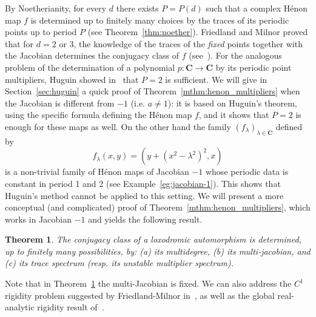 \documentclass[oneside, 12pt]{amsart}
\newcommand{\C}{\mathbf{C}}
\theoremstyle{plain}
\newtheorem{mthm}{Theorem}
\theoremstyle{definition}
\numberwithin{equation}{section}       %
\numberwithin{equation}{section}       %
\begin{document}
By Noetherianity,
for every $d$ there exists $P=P(d)$ 
such that a complex Hénon map $f$ is determined
up to finitely many choices by the  traces of its  periodic points up to period 
$P$ (see  Theorem~\ref{thm:noether}). Friedland and Milnor proved that for $d=2$ or 3, the knowledge of the 
traces of the  \emph{fixed} points together with the Jacobian determines the 
conjugacy class of $f$ (see~\cite[\S 7]{friedland-milnor}). 
 For the analogous problem of the determination of a polynomial $p:\C\to \C$ by its periodic point multipliers, Huguin showed in~\cite{huguin:polynomials} that $P = 2$ is sufficient. 
 We will give in Section~\ref{sec:huguin} a quick proof of Theorem~\ref{mthm:henon_multipliers} when the 
Jacobian is different from $-1$ (i.e. $a\neq 1$): it is 
  based on Huguin's theorem, using  the   specific formula defining the Hénon map $f$, and it shows that $P=2$ is enough for these maps as well.  
On the other hand the family $(f_\lambda)_{\lambda\in \C}$ defined by 
\begin{equation}\label{eq:jac-1}
f_\lambda (x,y) = (y+ (x^2-\lambda^2)^2, x) \end{equation} 
is a non-trivial family of Hénon maps of Jacobian $-1$
whose periodic data is constant in period 1 and 2 (see Example~\ref{eg:jacobian-1}). 
This shows that Huguin's method cannot be applied  to this setting. 
We will present a more conceptual 
(and  complicated) proof of Theorem~\ref{mthm:henon_multipliers}, which 
works in  Jacobian   $-1$ and  
yields the following result.




\begin{mthm}\label{mthm:multi-Jacobian}
The conjugacy class of a loxodromic automorphism is determined, up to finitely many possibilities, by: (a) its multidegree, (b) its multi-jacobian, and (c)  
its trace spectrum (resp. its unstable multiplier spectrum). 
\end{mthm}

Note that in Theorem~\ref{mthm:multi-Jacobian} the multi-Jacobian is fixed. 
We can also address the $C^1$ rigidity problem
 suggested by Friedland-Milnor in~\cite[Thm 7.5]{friedland-milnor}, as well as the global
  real-analytic rigidity result of~\cite[Thm 7.1]{rigidity}. 
\end{document}
